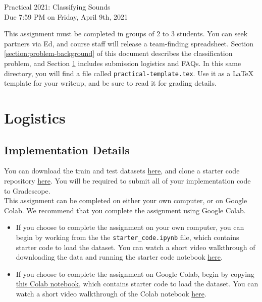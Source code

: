 \documentclass[12pt]{article}
\begin{document}
\begin{center}
{\Large Practical 2021: Classifying Sounds}\\
\vspace{0.25 cm} Due 7:59 PM on Friday, April 9th, 2021\\
\end{center}

\noindent This assignment must be completed in groups of 2 to 3 students. You can seek partners via Ed, and course staff will release a team-finding spreadsheet. Section \ref{section:problem-background} of this document describes the classification problem, and Section \ref{section:logistics} includes submission logistics and FAQs. In this same directory, you will find a file called \texttt{practical-template.tex}. Use it as a \LaTeX \hspace{1pt} template for your writeup, and be sure to read it for grading details.


\section{Logistics}\label{section:logistics}

\subsection{Implementation Details}

You can download the train and test datasets \href{https://console.cloud.google.com/storage/browser/cs181_practical_data}{here}, and clone a starter code repository \href{https://github.com/harvard-ml-courses/cs181-s21-homeworks/tree/main/practical}{here}.  You will be required to submit all of your implementation code to Gradescope.\\

\noindent This assignment can be completed on either your own computer, or on Google Colab.  We recommend that you complete the assignment using Google Colab.

\begin{itemize}
    \item If you choose to complete the assignment on your own computer, you can begin by working from the the \texttt{starter\_code.ipynb} file, which contains starter code to load the dataset. You can watch a short video walkthrough of downloading the data and running the starter code notebook \href{https://harvard.zoom.us/rec/share/cej4SbOhKoxWDXGINxjow7eGhK_UA2IW_6pxcWdnk7GjCqQDvBB0dejO1XfvdUyC.gSKJkuqNFORO8QJo}{here}.
    \item If you choose to complete the assignment on Google Colab, begin by copying \href{https://colab.research.google.com/drive/1HO6rKLHaaFohXxPjDSaEqgwzdTaPuOBP?usp=sharing}{this Colab notebook}, which contains starter code to load the dataset.  You can watch a short video walkthrough of the Colab notebook \href{https://harvard.zoom.us/rec/share/VwVJlAqCM5zODKRDStiVwHPzVX2aduA5YQBK1AWy1oVNNL60DHYXHOUEcMk1Kdhe.ljdo3HSdxyHgg1zt}{here}.
\end{itemize}
\end{document}
